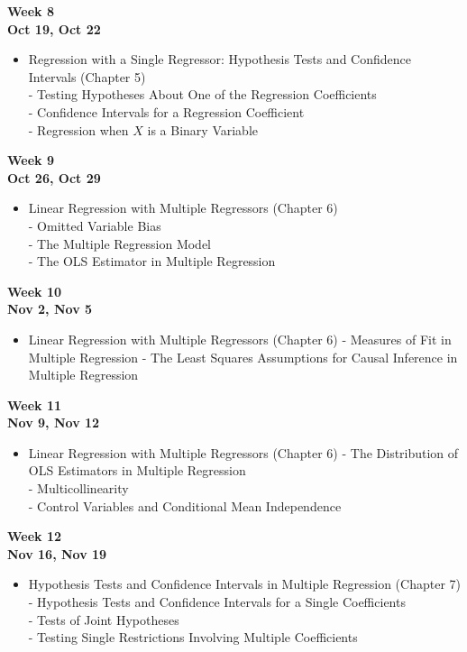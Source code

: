 \documentclass[
]{book}
\providecommand{\tightlist}{%
  \setlength{\itemsep}{0pt}\setlength{\parskip}{0pt}}
\begin{document}
\textbf{Week 8}\\
\textbf{Oct 19, Oct 22}

\begin{itemize}
\tightlist
\item
  Regression with a Single Regressor: Hypothesis Tests and Confidence Intervals (Chapter 5)\\
  - Testing Hypotheses About One of the Regression Coefficients\\
  - Confidence Intervals for a Regression Coefficient\\
  - Regression when \(X\) is a Binary Variable
\end{itemize}

\textbf{Week 9}\\
\textbf{Oct 26, Oct 29}

\begin{itemize}
\tightlist
\item
  Linear Regression with Multiple Regressors (Chapter 6)\\
  - Omitted Variable Bias\\
  - The Multiple Regression Model\\
  - The OLS Estimator in Multiple Regression
\end{itemize}

\textbf{Week 10}\\
\textbf{Nov 2, Nov 5}

\begin{itemize}
\tightlist
\item
  Linear Regression with Multiple Regressors (Chapter 6)
  - Measures of Fit in Multiple Regression
  - The Least Squares Assumptions for Causal Inference in Multiple Regression
\end{itemize}

\textbf{Week 11}\\
\textbf{Nov 9, Nov 12}

\begin{itemize}
\tightlist
\item
  Linear Regression with Multiple Regressors (Chapter 6)
  - The Distribution of OLS Estimators in Multiple Regression\\
  - Multicollinearity\\
  - Control Variables and Conditional Mean Independence
\end{itemize}

\textbf{Week 12}\\
\textbf{Nov 16, Nov 19}

\begin{itemize}
\tightlist
\item
  Hypothesis Tests and Confidence Intervals in Multiple Regression (Chapter 7)\\
  - Hypothesis Tests and Confidence Intervals for a Single Coefficients\\
  - Tests of Joint Hypotheses\\
  - Testing Single Restrictions Involving Multiple Coefficients
\end{itemize}
\end{document}
